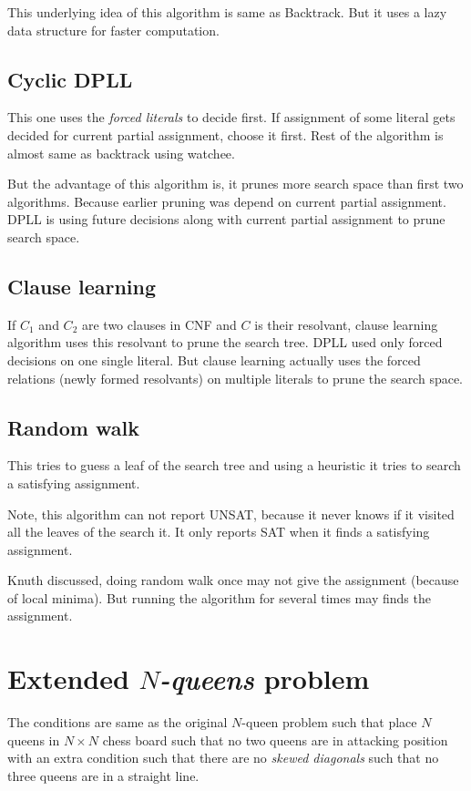 \documentclass[a4paper]{article}
\begin{document}
This underlying idea of this algorithm is same as Backtrack. But it uses a lazy data structure for faster computation.

\subsection{Cyclic DPLL}

This one uses the \emph{forced literals} to decide first. If assignment of some literal gets decided for current partial assignment, choose it first. Rest of the algorithm is almost same as backtrack using watchee.

But the advantage of this algorithm is, it prunes more search space than first two algorithms. Because earlier pruning was depend on current partial assignment. DPLL is using future decisions along with current partial assignment to prune search space.

\subsection{Clause learning}

If $C_1$ and $C_2$ are two clauses in CNF and $C$ is their resolvant, clause learning algorithm uses this resolvant to prune the search tree. DPLL used only forced decisions on one single literal. But clause learning actually uses the forced relations (newly formed resolvants) on multiple literals to prune the search space.

\subsection{Random walk}

This tries to guess a leaf of the search tree and using a heuristic it tries to search a satisfying assignment.

Note, this algorithm can not report UNSAT, because it never knows if it visited all the leaves of the search it. It only reports SAT when it finds a satisfying assignment.

Knuth discussed, doing random walk once may not give the assignment (because of local minima). But running the algorithm for several times may finds the assignment.

\section{Extended \emph{$N$-queens} problem}

The conditions are same as the original $N$-queen problem such that place $N$ queens in $N \times N$ chess board such that no two queens are in attacking position with an extra condition such that there are no \emph{skewed diagonals} such that no three queens are in a straight line.
\end{document}

